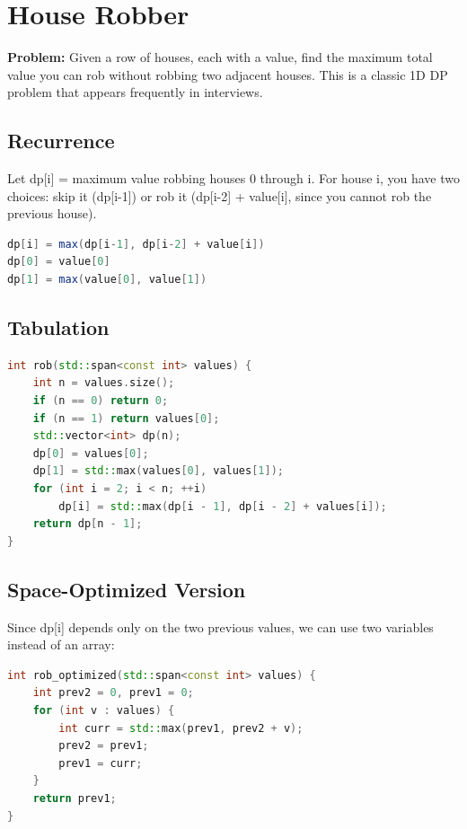 \section{House Robber}

\textbf{Problem:} Given a row of houses, each with a value, find the maximum total value you can rob without robbing two adjacent houses. This is a classic 1D DP problem that appears frequently in interviews.

\subsection{Recurrence}

Let dp[i] = maximum value robbing houses 0 through i. For house i, you have two choices: skip it (dp[i-1]) or rob it (dp[i-2] + value[i], since you cannot rob the previous house).

\begin{lstlisting}[language=Java]
dp[i] = max(dp[i-1], dp[i-2] + value[i])
dp[0] = value[0]
dp[1] = max(value[0], value[1])
\end{lstlisting}

\subsection{Tabulation}

\begin{lstlisting}[language=C++]
int rob(std::span<const int> values) {
    int n = values.size();
    if (n == 0) return 0;
    if (n == 1) return values[0];
    std::vector<int> dp(n);
    dp[0] = values[0];
    dp[1] = std::max(values[0], values[1]);
    for (int i = 2; i < n; ++i)
        dp[i] = std::max(dp[i - 1], dp[i - 2] + values[i]);
    return dp[n - 1];
}
\end{lstlisting}

\subsection{Space-Optimized Version}

Since dp[i] depends only on the two previous values, we can use two variables instead of an array:

\begin{lstlisting}[language=C++]
int rob_optimized(std::span<const int> values) {
    int prev2 = 0, prev1 = 0;
    for (int v : values) {
        int curr = std::max(prev1, prev2 + v);
        prev2 = prev1;
        prev1 = curr;
    }
    return prev1;
}
\end{lstlisting}

